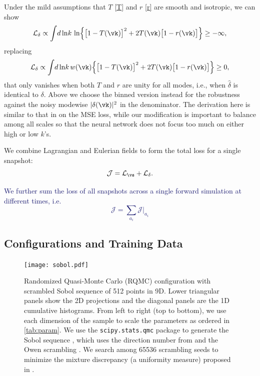 \documentclass[modern, trackchanges, dvipsnames]{aastex631}
\renewcommand{\d}{d}
\newcommand{\cJ}{\mathcal{J}}
\newcommand{\cL}{\mathcal{L}}
\newcommand{\YZ}[1]{\textcolor{MidnightBlue}{#1}}
\begin{document}
Under the mild assumptions that $T$ \eqref{T} and $r$ \eqref{r} are smooth
and isotropic, we can show
%
\begin{equation}
\cL_\delta \propto \int \!\d\ln\!k\, \ln
\Bigl\{ \bigl[ 1 - T(\vk) \bigr]^2
  + 2 T(\vk) \bigl[ 1 - r(\vk) \bigr] \Bigr\} \geq -\infty,
\end{equation}
%
replacing
%
\begin{equation}
\cL_\delta \propto \int \!\d\ln\!k\, w(\vk)
\Bigl\{ \bigl[ 1 - T(\vk) \bigr]^2
  + 2 T(\vk) \bigl[ 1 - r(\vk) \bigr] \Bigr\} \geq 0,
\end{equation}
%
that only vanishes when both $T$ and $r$ are unity for all modes, i.e.,
when $\hat\delta$ is identical to $\delta$.
Above we choose the binned version instead for the robustness against
the noisy modewise $|\delta(\vk)|^2$ in the denominator.
The derivation here is similar to that in \citet{HeEtAl2019} on the MSE
loss, while our modification is important to balance among all scales so
that the neural network does not focus too much on either high or low
$k$'s.

We combine Lagrangian and Eulerian fields to form the total loss for a single
snapshot:
%
\begin{equation}
\cJ = \cL_\vs + \cL_\delta.
\end{equation}
%

\YZ{We further sum the loss of all snapshots across a single forward simulation
at different times, i.e.
\begin{equation}
\cJ = \sum_{a_i} \cJ |_{a_i}
\end{equation}
}


\vspace{1em}
\subsection{Configurations and Training Data}

\begin{figure}
  \centering
  \texttt{[image: sobol.pdf]}
  \caption{Randomized Quasi-Monte Carlo (RQMC) configuration with
    scrambled Sobol sequence of 512 points in 9D.
    Lower triangular panels show the 2D projections and the diagonal
    panels are the 1D cumulative histograms.
    From left to right (top to bottom), we use each dimension of the
    sample to scale the parameters as ordered in \autoref{tab:param}.
    We use the \texttt{scipy.stats.qmc} package \citep{SciPy} to
    generate the Sobol sequence \citep{Sobol1967}, which uses the
    direction number from \citet{JoeKuo2008} and the Owen scrambling
    \citep{Owen1998}.
    We search among 65536 scrambling seeds to minimize the mixture
    discrepancy (a uniformity measure) proposed in \citet{Zhou2013MD}.
  }
  \label{fig:sobol}
\end{figure}
\end{document}
